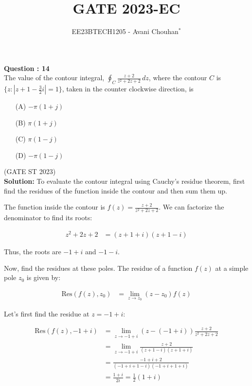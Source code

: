 \documentclass[journal,12pt,twocolumn]{IEEEtran}
\theoremstyle{remark}
\begin{document}

\vspace{3cm}

\title{GATE 2023-EC}
\author{EE23BTECH1205 - Avani Chouhan$^{*}$%
}
\maketitle
\newpage
\bigskip

\renewcommand{\thefigure}{\theenumi}
\renewcommand{\thetable}{\theenumi}

\vspace{3cm}
\textbf{Question : 14} \\
The value of the contour integral, $\oint_C \frac{z + 2}{z^2 + 2z + 2} \, dz$, where the contour $C$ is $\{ z : |z + 1 - \frac{3}{2}i| = 1 \}$, taken in the counter clockwise direction, is \\

\begin{enumerate}
  \item[(A)] $-\pi(1+j) $
  \item[(B)] $\pi(1+j)$
  \item[(C)] $\pi(1-j) $
  \item[(D)] $-\pi(1-j)$
\end{enumerate}

\hfill{(GATE ST 2023)}\\
\textbf{Solution:}
To evaluate the contour integral using Cauchy's residue theorem, first find the residues of the function inside the contour and then sum them up.

The function inside the contour is $f(z) = \frac{z + 2}{z^2 + 2z + 2}$. We can factorize the denominator to find its roots:

\begin{align}
z^2 + 2z + 2 &= (z+1+i)(z+1-i)
\end{align}

Thus, the roots are $-1+i$ and $-1-i$.

Now, find the residues at these poles. The residue of a function $f(z)$ at a simple pole $z_0$ is given by:

\begin{align}
\text{Res}(f(z), z_0) &= \lim_{z \to z_0} (z - z_0)f(z)
\end{align}

Let's first find the residue at $z = -1 + i$:

\begin{align}
\text{Res}(f(z), -1+i) &= \lim_{z \to -1+i} (z - (-1+i))\frac{z + 2}{z^2 + 2z + 2} \\
&= \lim_{z \to -1+i} \frac{z + 2}{(z+1-i)(z+1+i)} \\
&= \frac{-1+i + 2}{(-1+i+1-i)(-1+i+1+i)} \\
&= \frac{1+i}{2i} = \frac{1}{2}(1+i)
\end{align}
\end{document}
